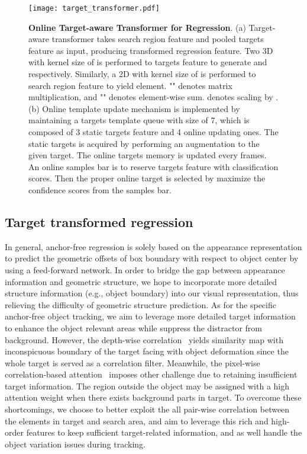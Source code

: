 \documentclass[10pt,twocolumn,letterpaper]{article}
\begin{document}
\begin{figure*}[t]
\begin{center}
\texttt{[image: target\_transformer.pdf]}
\end{center}
   \caption{{\bf Online Target-aware Transformer for Regression}. 
   (a) Target-aware transformer takes search region feature and pooled targets feature as input, producing transformed regression feature. Two 3D  with kernel size of  is performed to targets feature to generate  and  respectively. Similarly, a 2D  with kernel size of  is performed to search region feature to yield  element. "" denotes matrix multiplication, and "" denotes element-wise sum.  denotes scaling by . (b) Online template update mechanism is implemented by maintaining a targets template queue with size of 7, which is composed of 3 static targets feature and 4 online updating ones. The static targets is acquired by performing an augmentation to the given target. The online targets memory is updated every  frames. An online samples bar is to reserve  targets feature with classification scores. Then the proper online target is selected by maximize the confidence scores from the samples bar.
   }
\label{fig:transformer}
\vspace{-0.2cm}
\end{figure*}


\subsection{Target transformed regression}

In general, anchor-free regression is solely based on the appearance representation to predict the geometric offsets of box boundary with respect to object center by using a feed-forward network. In order to bridge the gap between appearance information and geometric structure, we hope to incorporate more detailed structure information (e.g., object boundary) into our visual representation, thus relieving the difficulty of geometric structure prediction. As for the specific anchor-free object tracking, we aim to leverage more detailed target information to enhance the object relevant areas while suppress the distractor from background. However, the depth-wise correlation~\cite{siamban,siamfc++,ocean,siamcar} yields similarity map with inconspicuous boundary of the target facing with object deformation since the whole target is served as a correlation filter. Meanwhile, the pixel-wise correlation-based attention~\cite{CGACD} imposes other challenge due to retaining insufficient target information. The region outside the object may be assigned with a high attention weight when there exists background parts in target.
To overcome these shortcomings, we choose to better exploit the all pair-wise correlation between the elements in target and search area, and aim to leverage this rich and high-order features to keep sufficient target-related information, and as well handle the object variation issues during tracking.
\end{document}
